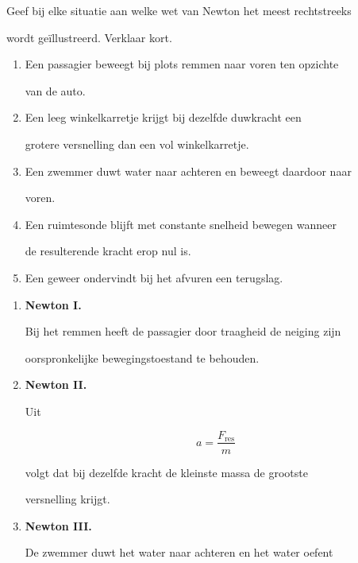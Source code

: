 \documentclass{ximera}
\begin{document}
\begin{oefening}{\oefB\ESS}

Geef bij elke situatie aan welke wet van Newton het meest rechtstreeks

wordt geïllustreerd. Verklaar kort.

\begin{enumerate}

 \item Een passagier beweegt bij plots remmen naar voren ten opzichte

    van de auto.

 \item Een leeg winkelkarretje krijgt bij dezelfde duwkracht een

    grotere versnelling dan een vol winkelkarretje.

 \item Een zwemmer duwt water naar achteren en beweegt daardoor naar

    voren.

 \item Een ruimtesonde blijft met constante snelheid bewegen wanneer

    de resulterende kracht erop nul is.

 \item Een geweer ondervindt bij het afvuren een terugslag.

\end{enumerate}


\begin{oplossing}

\begin{enumerate}

  \item \textbf{Newton I.}

  Bij het remmen heeft de passagier door traagheid de neiging zijn

  oorspronkelijke bewegingstoestand te behouden.

  \item \textbf{Newton II.}

  Uit

  \[a=\frac{F_{\mathrm{res}}}{m}\]

  volgt dat bij dezelfde kracht de kleinste massa de grootste

  versnelling krijgt.

  \item \textbf{Newton III.}

  De zwemmer duwt het water naar achteren en het water oefent


\end{enumerate}
\end{oplossing}
\end{oefening}
\end{document}
